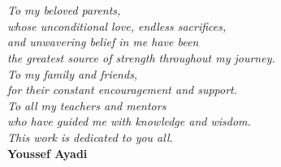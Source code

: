 \chapter*{}
\thispagestyle{empty}
\vspace*{5cm}

\begin{flushright}
\textit{To my beloved parents,}\\[0.4cm]
\textit{whose unconditional love, endless sacrifices,}\\
\textit{and unwavering belief in me have been}\\
\textit{the greatest source of strength throughout my journey.}\\[0.8cm]
\textit{To my family and friends,}\\
\textit{for their constant encouragement and support.}\\[0.8cm]
\textit{To all my teachers and mentors}\\
\textit{who have guided me with knowledge and wisdom.}\\[0.8cm]
\textit{This work is dedicated to you all.}\\[1.5cm]
\textbf{Youssef Ayadi}
\end{flushright}